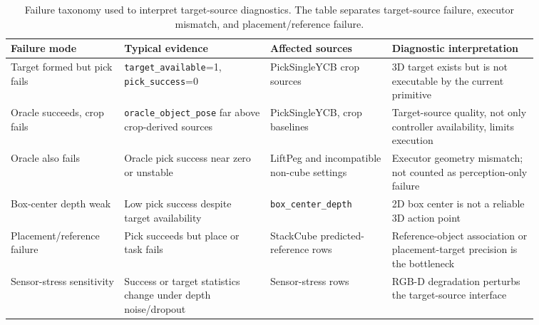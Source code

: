 \begin{table}[t]
\centering
\caption{Failure taxonomy used to interpret target-source diagnostics. The
table separates target-source failure, executor mismatch, and
placement/reference failure.}
\label{tab:failure-taxonomy}
\small
\setlength{\tabcolsep}{3pt}
\begin{tabular}{p{0.18\linewidth}p{0.24\linewidth}p{0.20\linewidth}p{0.24\linewidth}}
\toprule
Failure mode & Typical evidence & Affected sources & Diagnostic interpretation \\
\midrule
Target formed but pick fails &
\texttt{target\_available}=1, \texttt{pick\_success}=0 &
PickSingleYCB crop sources &
3D target exists but is not executable by the current primitive \\
\midrule
Oracle succeeds, crop fails &
\texttt{oracle\_object\_pose} far above crop-derived sources &
PickSingleYCB, crop baselines &
Target-source quality, not only controller availability, limits execution \\
\midrule
Oracle also fails &
Oracle pick success near zero or unstable &
LiftPeg and incompatible non-cube settings &
Executor geometry mismatch; not counted as perception-only failure \\
\midrule
Box-center depth weak &
Low pick success despite target availability &
\texttt{box\_center\_depth} &
2D box center is not a reliable 3D action point \\
\midrule
Placement/reference failure &
Pick succeeds but place or task fails &
StackCube predicted-reference rows &
Reference-object association or placement-target precision is the bottleneck \\
\midrule
Sensor-stress sensitivity &
Success or target statistics change under depth noise/dropout &
Sensor-stress rows &
RGB-D degradation perturbs the target-source interface \\
\bottomrule
\end{tabular}
\end{table}
